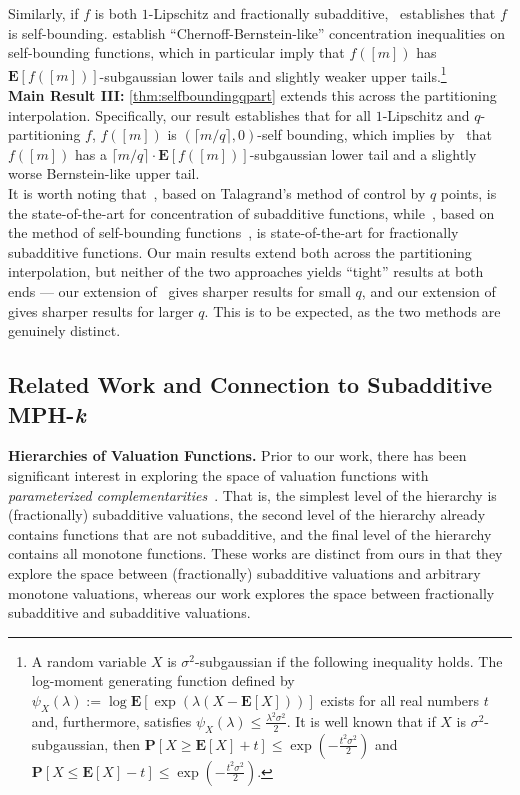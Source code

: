 \documentclass[11pt]{article}%
\numberwithin{theorem}{subsection}
\newcommand{\prob}{\mathbf{P}}
\newcommand{\expect}{\mathbf{E}}
\def\hmath$#1${\texorpdfstring{{\rmfamily\textit{#1}}}{#1}}
\begin{document}
Similarly, if $f$ is both $1$-Lipschitz and fractionally subadditive,~\cite{Vondrak10} establishes that $f$ is self-bounding. \cite{BoucheronLM00} establish ``Chernoff-Bernstein-like'' concentration inequalities on self-bounding functions, which in particular imply that $f([m])$ has $\expect[f([m])]$-subgaussian lower tails and slightly weaker upper tails.\footnote{A random variable $X$ is $\sigma^2$-subgaussian if the following inequality holds.  The log-moment generating function defined by $\psi_X(\lambda):=\log \expect[\exp(\lambda(X - \expect[X]))]$ exists for all real numbers $t$ and, furthermore, satisfies 
$\psi_X(\lambda)\le \frac{\lambda^2\sigma^2}{2}.$ It is well known that if $X$ is $\sigma^2$-subgaussian, then
$\prob[X\ge \expect[X] + t]\le \exp(-\frac{t^2\sigma^2}{2})$ and 
$\prob[X\le \expect[X] - t]\le \exp(-\frac{t^2\sigma^2}{2}).$
}\\

\noindent\textbf{Main Result III:} \cref{thm:selfboundingqpart} extends this across the partitioning interpolation. Specifically, our result establishes that for all $1$-Lipschitz and $q$-partitioning $f$, $f([m])$ is $(\lceil m/q \rceil,0)$-self bounding, which implies by~\cite{McDiarmidR06,BoucheronLM09} that $f([m])$ has a $\lceil m/q \rceil\cdot \expect[f([m])]$-subgaussian lower tail and a slightly worse Bernstein-like upper tail.\\

It is worth noting that~\cite{schectman}, based on Talagrand's method of control by $q$ points, is the state-of-the-art for concentration of subadditive functions, while~\cite{Vondrak10}, based on the method of self-bounding functions~\cite{BoucheronLM00,McDiarmidR06,BoucheronLM09}, is state-of-the-art for fractionally subadditive functions. Our main results extend both across the partitioning interpolation, but neither of the two approaches yields ``tight'' results at both ends --- our extension of~\cite{schectman} gives sharper results for small $q$, and our extension of~\cite{Vondrak10} gives sharper results for larger $q$. This is to be expected, as the two methods are genuinely distinct. 

\subsection{Related Work and Connection to Subadditive MPH-\hmath$k$}

\noindent\textbf{Hierarchies of Valuation Functions.} Prior to our work, there has been significant interest in exploring the space of valuation functions with \emph{parameterized complementarities}~\cite{AbrahamBDR12,FeigeFIILS15,FeigeI13,FeldmanFMR16,FeldmanI14,FeldmanI17, EdenFFTW21}. That is, the simplest level of the hierarchy is (fractionally) subadditive valuations, the second level of the hierarchy already contains functions that are not subadditive, and the final level of the hierarchy contains all monotone functions. These works are distinct from ours in that they explore the space between (fractionally) subadditive valuations and arbitrary monotone valuations, whereas our work explores the space between fractionally subadditive and subadditive valuations. 
\end{document}
